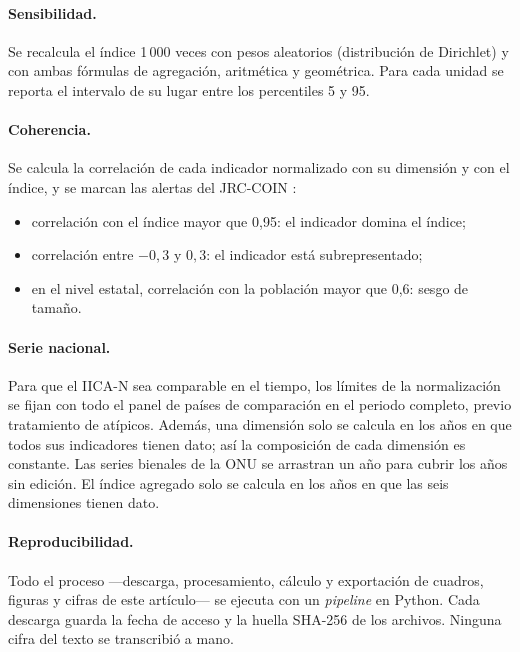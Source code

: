 \documentclass[11pt,a4paper]{article}
\begin{document}
\paragraph{Sensibilidad.} Se recalcula el índice 1\,000 veces con pesos aleatorios (distribución de Dirichlet) y con ambas fórmulas de agregación, aritmética y geométrica. Para cada unidad se reporta el intervalo de su lugar entre los percentiles 5 y 95.

\paragraph{Coherencia.} Se calcula la correlación de cada indicador normalizado con su dimensión y con el índice, y se marcan las alertas del JRC-COIN \parencite{jrc_coin_2019}:
\begin{itemize}
  \item correlación con el índice mayor que 0,95: el indicador domina el índice;
  \item correlación entre $-0{,}3$ y $0{,}3$: el indicador está subrepresentado;
  \item en el nivel estatal, correlación con la población mayor que 0,6: sesgo de tamaño.
\end{itemize}

\paragraph{Serie nacional.} Para que el IICA-N sea comparable en el tiempo, los límites de la normalización se fijan con todo el panel de países de comparación en el periodo completo, previo tratamiento de atípicos. Además, una dimensión solo se calcula en los años en que todos sus indicadores tienen dato; así la composición de cada dimensión es constante. Las series bienales de la ONU \parencite{undesa_egov2024} se arrastran un año para cubrir los años sin edición. El índice agregado solo se calcula en los años en que las seis dimensiones tienen dato.

\paragraph{Reproducibilidad.} Todo el proceso ---descarga, procesamiento, cálculo y exportación de cuadros, figuras y cifras de este artículo--- se ejecuta con un \emph{pipeline} en Python. Cada descarga guarda la fecha de acceso y la huella SHA-256 de los archivos. Ninguna cifra del texto se transcribió a mano.

\end{document}
